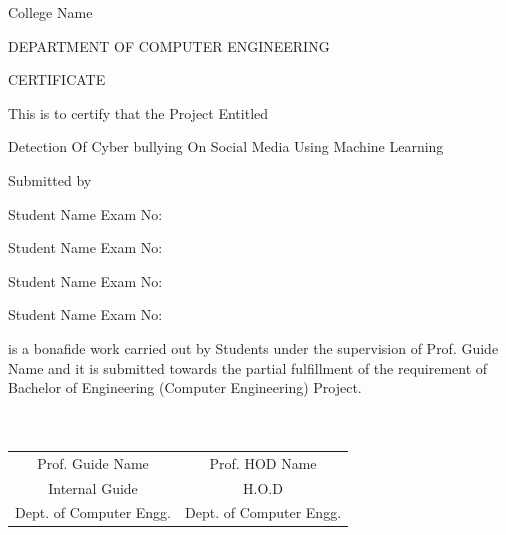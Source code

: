 \documentclass[oneside,a4paper,12pt]{report}
\begin{document}
{\bfseries \fontsize{14}{12} \selectfont \centerline{College Name}
\centerline{DEPARTMENT OF COMPUTER ENGINEERING}
\vspace*{3\baselineskip}} 


{\bfseries \fontsize{16}{12} \selectfont \centerline{CERTIFICATE} 
\vspace*{3\baselineskip}} 

\centerline{This is to certify that the Project Entitled}
\vspace*{1\baselineskip} 


{\bfseries \fontsize{14}{12} \selectfont \centerline{Detection Of Cyber bullying On Social Media Using Machine Learning}
\vspace*{1\baselineskip}}

\centerline{Submitted by}
\vspace*{1\baselineskip} 
\centerline{Student Name  \hspace{25 mm} Exam No: } 
\centerline{Student Name \hspace{25 mm} Exam No:  } 
\centerline{Student Name \hspace{25 mm} Exam No: }
\centerline{Student Name \hspace{25 mm} Exam No: }
\vspace*{1\baselineskip} 
is a bonafide work carried out by Students under the supervision of Prof. Guide Name and it
is submitted towards the partial fulfillment of the requirement of Bachelor of Engineering (Computer Engineering) Project.\\\\\\

\bgroup
\def\arraystretch{0.7}
\begin{tabular}{c c }
Prof. Guide Name &  \hspace{50 mm} Prof. HOD Name \\								
Internal Guide   &  \hspace{50 mm} H.O.D \\
Dept. of Computer Engg.  &	\hspace{50 mm}Dept. of Computer Engg.  \\
\end{tabular}



\newpage

\setcounter{page}{0}
\frontmatter
{}
\rfoot{\thepage}
\end{document}
